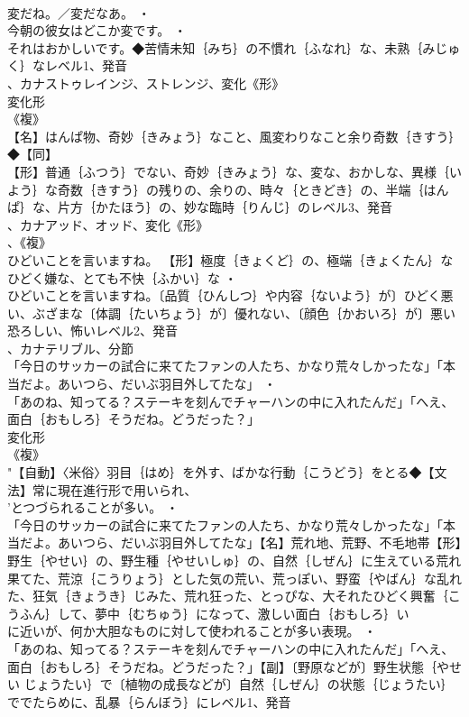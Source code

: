 \documentclass[8pt]{extreport}
\begin{document}
\begin{CJK}{UTF8}{min}
\\	変だね。／変だなあ。 ・
\\	今朝の彼女はどこか変です。 ・
\\	それはおかしいです。◆苦情未知｛みち｝の不慣れ｛ふなれ｝な、未熟｛みじゅく｝なレベル1、発音
\\	、カナストゥレインジ、ストレンジ、変化《形》
\\	変化形 
\\	《複》
\\	【名】はんぱ物、奇妙｛きみょう｝なこと、風変わりなこと余り奇数｛きすう｝◆【同】
\\	【形】普通｛ふつう｝でない、奇妙｛きみょう｝な、変な、おかしな、異様｛いよう｝な奇数｛きすう｝の残りの、余りの、時々｛ときどき｝の、半端｛はんぱ｝な、片方｛かたほう｝の、妙な臨時｛りんじ｝のレベル3、発音
\\	、カナアッド、オッド、変化《形》
\\	、《複》
\\	ひどいことを言いますね。		【形】極度｛きょくど｝の、極端｛きょくたん｝なひどく嫌な、とても不快｛ふかい｝な ・
\\	ひどいことを言いますね。〔品質｛ひんしつ｝や内容｛ないよう｝が〕ひどく悪い、ぶざまな〔体調｛たいちょう｝が〕優れない、〔顔色｛かおいろ｝が〕悪い恐ろしい、怖いレベル2、発音
\\	、カナテリブル、分節
\\	「今日のサッカーの試合に来てたファンの人たち、かなり荒々しかったな」「本当だよ。あいつら、だいぶ羽目外してたな」 ・
\\	「あのね、知ってる？ステーキを刻んでチャーハンの中に入れたんだ」「へえ、面白｛おもしろ｝そうだね。どうだった？」
\\	変化形 
\\	《複》
\\	"【自動】〈米俗〉羽目｛はめ｝を外す、ばかな行動｛こうどう｝をとる◆【文法】常に現在進行形で用いられ、
\\	'とつづられることが多い。 ・
\\	「今日のサッカーの試合に来てたファンの人たち、かなり荒々しかったな」「本当だよ。あいつら、だいぶ羽目外してたな」【名】荒れ地、荒野、不毛地帯【形】野生｛やせい｝の、野生種｛やせいしゅ｝の、自然｛しぜん｝に生えている荒れ果てた、荒涼｛こうりょう｝とした気の荒い、荒っぽい、野蛮｛やばん｝な乱れた、狂気｛きょうき｝じみた、荒れ狂った、とっぴな、大それたひどく興奮｛こうふん｝して、夢中｛むちゅう｝になって、激しい面白｛おもしろ｝い
\\	に近いが、何か大胆なものに対して使われることが多い表現。 ・
\\	「あのね、知ってる？ステーキを刻んでチャーハンの中に入れたんだ」「へえ、面白｛おもしろ｝そうだね。どうだった？」【副】〔野原などが〕野生状態｛やせい じょうたい｝で〔植物の成長などが〕自然｛しぜん｝の状態｛じょうたい｝ででたらめに、乱暴｛らんぼう｝にレベル1、発音

\end{CJK}
\end{document}

